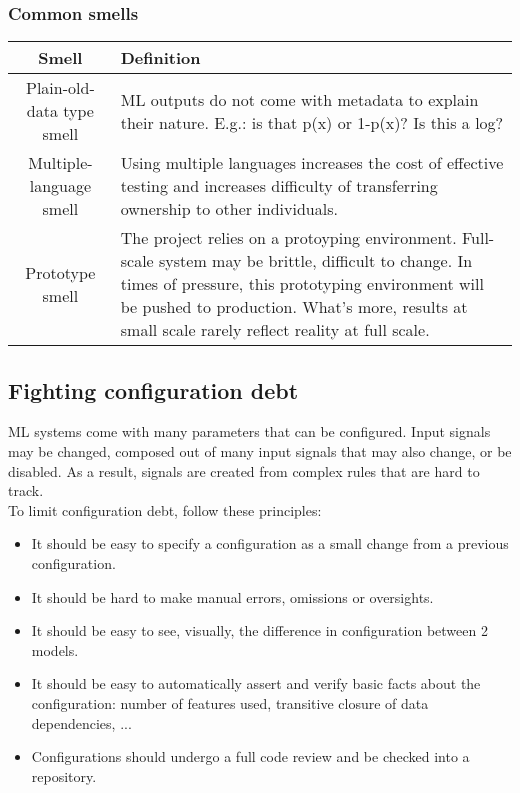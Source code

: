 \documentclass{report}
\begin{document}
\subsubsection{Common smells}
\begin{center}
    \begin{tabular}{ |c|p{10cm}|}
        \hline
        Smell & Definition \\
        \hline
        \hline
        Plain-old-data type smell& ML outputs do not come with metadata to explain their nature.
            E.g.: is that p(x) or 1-p(x)? Is this a log?  \\
        \hline
        Multiple-language smell & Using multiple languages increases the cost of effective testing
            and increases difficulty of transferring ownership to other individuals.\\
        \hline
        Prototype smell & The project relies on a protoyping environment. Full-scale system may be
            brittle, difficult to change. In times of pressure, this prototyping environment will be
            pushed to production. What's more, results at small scale rarely reflect reality at
            full scale.\\
        \hline
    \end{tabular}
\end{center}

\subsection{Fighting configuration debt}
ML systems come with many parameters that can be configured. Input signals may be changed, composed
out of many input signals that may also change, or be disabled. As a result, signals are created from
complex rules that are hard to track. \\
To limit configuration debt, follow these principles:
\begin{itemize}
    \item It should be easy to specify a configuration as a small change from a previous configuration.
    \item It should be hard to make manual errors, omissions or oversights.
    \item It should be easy to see, visually, the difference in configuration between 2 models.
    \item It should be easy to automatically assert and verify basic facts about the configuration:
        number of features used, transitive closure of data dependencies, ...
    \item Configurations should undergo a full code review and be checked into a repository.
\end{itemize}
\end{document}
